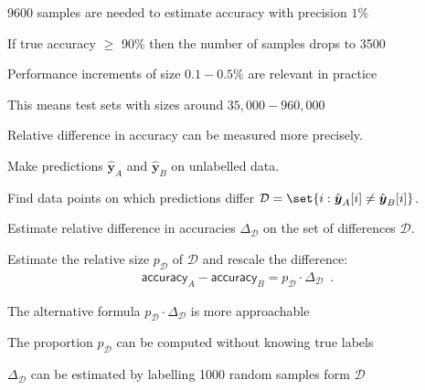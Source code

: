 \documentclass[landscape,footrule]{foils}
\renewcommand{\vec}[1]{\boldsymbol{#1}}
\begin{document}


\begin{triangles}
\item 9600 samples are needed to estimate accuracy with precision $1\%$
\item If true accuracy $\geq$ 90\% then the number of samples drops to 3500
\item Performance increments of size $0.1-0.5\%$ are relevant in practice
\item This means test sets with sizes around $35,000-960,000$ 
\end{triangles}




Relative difference in accuracy can be measured more precisely.
\begin{triangles}
\item Make predictions $\hat{\vec{y}}_A$ and $\hat{\vec{y}}_B$ on unlabelled data.
\item Find data points on which predictions differ $\mathcal{D}=\set{i: \hat{\vec{y}}_A[i]\neq \hat{\vec{y}}_B[i]}$.
\item Estimate relative difference in accuracies $\Delta_\mathcal{D}$ on the set of differences $\mathcal{D}$.
\item Estimate the relative size $p_\mathcal{D}$ of $\mathcal{D}$ and rescale the difference:
\begin{align*}
\mathsf{accuracy}_A-\mathsf{accuracy}_B= p_\mathcal{D}\cdot \Delta_\mathcal{D}\enspace.
\end{align*}  
\end{triangles}



The alternative formula $p_\mathcal{D}\cdot \Delta_\mathcal{D}$ is more approachable
\begin{triangles}
\item The proportion $p_\mathcal{D}$ can be computed without knowing true labels
\item $\Delta_\mathcal{D}$ can be estimated by labelling 1000 random samples form $\mathcal{D}$
\end{triangles}
\vspace*{1cm}
\end{document}
